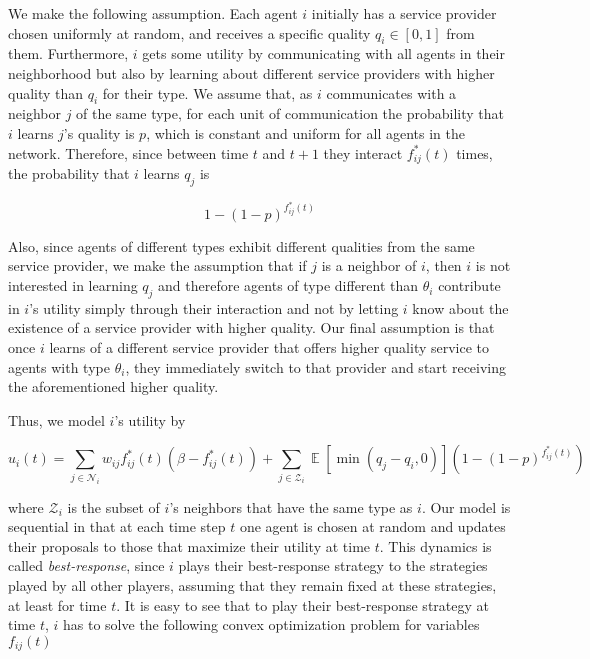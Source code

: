 \documentclass[A4paper,11pt]{article}
\newcommand{\Ex}{\mathop{\mathbb{E}}}
\begin{document}
\par We make the following assumption. Each agent $i$ initially has a service provider chosen uniformly at random, and receives a
specific quality $q_i \in [0, 1]$ from them. Furthermore, $i$ gets some utility by communicating with all agents in their
neighborhood but also by learning about different service providers with higher quality than $q_i$ for their type. We assume
that, as $i$ communicates with a neighbor $j$ of the same type, for each unit of communication the probability that $i$ learns
$j$'s quality is $p$, which is constant and uniform for all agents in the network. Therefore, since between time $t$ and $t+1$
they interact $f^*_{ij}(t)$ times, the probability that $i$ learns $q_j$ is

\[
1 - {\left( 1 - p \right)}^{f^*_{ij}(t)}
\]

\par Also, since agents of different types exhibit different qualities from the same service provider, we make the assumption
that if $j$ is a neighbor of $i$, then $i$ is not interested in learning $q_j$ and therefore agents of type different than
$\theta_i$ contribute in $i$'s utility simply through their interaction and not by letting $i$ know about the existence of a
service provider with higher quality. Our final assumption is that once $i$ learns of a different service provider that offers
higher quality service to agents with type $\theta_i$, they immediately switch to that provider and start receiving the
aforementioned higher quality.

\par Thus, we model $i$'s utility by

\begin{equation}\label{eq:util}
u_i(t) = \sum_{j \in \mathcal{N}_i} {w_{ij} f^*_{ij}(t) \left( \beta - f^*_{ij}(t) \right) } +
\sum_{j \in \mathcal{Z}_i} {\Ex \left[ \min \left( q_j - q_i, 0 \right) \right] \left( 1 - {\left( 1 - p \right)}^{f^*_{ij}(t)} \right) }
\end{equation}

where $\mathcal{Z}_i$ is the subset of $i$'s neighbors that have the same type as $i$. Our model is sequential in that at each
time step $t$ one agent is chosen at random and updates their proposals to those that maximize their utility at time $t$.
This dynamics is called \textit{best-response}, since $i$ plays their best-response strategy to the strategies played by all
other players, assuming that they remain fixed at these strategies, at least for time $t$. It is easy to see that to play their
best-response strategy at time $t$, $i$ has to solve the following convex optimization problem for variables $f_{ij}(t)$
\end{document}
